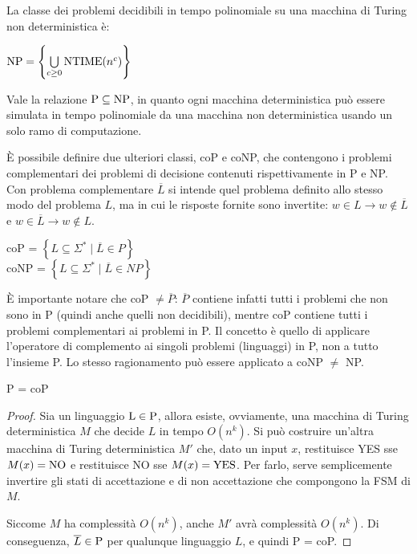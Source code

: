 \begin{rem}
    La classe dei problemi decidibili in tempo polinomiale su una macchina di Turing non deterministica è:
    \begin{center}
        $\textnormal{NP} = \left\{ \bigcup\limits_{c \ge 0} \textnormal{NTIME}(n^c) \right\}$
    \end{center}
\end{rem}

\begin{rem}
    Vale la relazione $\textnormal{P} \subseteq \textnormal{NP}$, in quanto ogni macchina deterministica può essere simulata in tempo polinomiale da una macchina non deterministica usando un solo ramo di computazione.
\end{rem}

È possibile definire due ulteriori classi, coP e coNP, che contengono i problemi complementari dei problemi di decisione contenuti rispettivamente in P e NP. Con problema complementare $\overline{L}$ si intende quel problema definito allo stesso modo del problema $L$, ma in cui le risposte fornite sono invertite: $w \in L \rightarrow w \notin \overline{L}$ e $w \in \overline{L} \rightarrow w \notin L$. 
\begin{center}
    coP = $\left\{ L \subseteq \Sigma^* \; | \; \overline{L} \in P \right\}$\\
    coNP = $\left\{ L \subseteq \Sigma^* \; | \; \overline{L} \in NP \right\}$
\end{center}

È importante notare che coP $\neq \overline{P}$: $\overline{P}$ contiene infatti tutti i problemi che non sono in P (quindi anche quelli non decidibili), mentre coP contiene tutti i problemi complementari ai problemi in P. Il concetto è quello di applicare l'operatore di complemento ai singoli problemi (linguaggi) in P, non a tutto l'insieme P.
Lo stesso ragionamento può essere applicato a coNP $\neq$ NP.

\begin{thm}
    \textnormal{P = coP}
\end{thm}
\begin{proof}
    Sia un linguaggio $\textnormal{L} \in \textnormal{P}$, allora esiste, ovviamente, una macchina di Turing deterministica $M$ che decide $L$ in tempo $O(n^k)$.
    Si può costruire un'altra macchina di Turing deterministica $M'$ che, dato un input $x$, restituisce YES sse $M(x) = \textnormal{NO}$ e restituisce NO sse $M(x) = \textnormal{YES}$. Per farlo, serve semplicemente invertire gli stati di accettazione e di non accettazione che compongono la FSM di $M$.

    Siccome $M$ ha complessità $O(n^k)$, anche $M'$ avrà complessità $O(n^k)$.
    Di conseguenza, $\overline{L} \in \textnormal{P}$ per qualunque linguaggio $L$, e quindi P = coP.
\end{proof}

